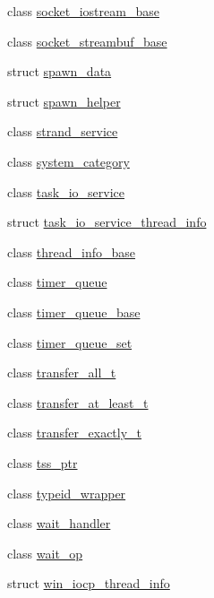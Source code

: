 \begin{DoxyCompactItemize}
class \hyperlink{classasio_1_1detail_1_1socket__iostream__base}{socket\+\_\+iostream\+\_\+base}
\item 
class \hyperlink{classasio_1_1detail_1_1socket__streambuf__base}{socket\+\_\+streambuf\+\_\+base}
\item 
struct \hyperlink{structasio_1_1detail_1_1spawn__data}{spawn\+\_\+data}
\item 
struct \hyperlink{structasio_1_1detail_1_1spawn__helper}{spawn\+\_\+helper}
\item 
class \hyperlink{classasio_1_1detail_1_1strand__service}{strand\+\_\+service}
\item 
class \hyperlink{classasio_1_1detail_1_1system__category}{system\+\_\+category}
\item 
class \hyperlink{classasio_1_1detail_1_1task__io__service}{task\+\_\+io\+\_\+service}
\item 
struct \hyperlink{structasio_1_1detail_1_1task__io__service__thread__info}{task\+\_\+io\+\_\+service\+\_\+thread\+\_\+info}
\item 
class \hyperlink{classasio_1_1detail_1_1thread__info__base}{thread\+\_\+info\+\_\+base}
\item 
class \hyperlink{classasio_1_1detail_1_1timer__queue}{timer\+\_\+queue}
\item 
class \hyperlink{classasio_1_1detail_1_1timer__queue__base}{timer\+\_\+queue\+\_\+base}
\item 
class \hyperlink{classasio_1_1detail_1_1timer__queue__set}{timer\+\_\+queue\+\_\+set}
\item 
class \hyperlink{classasio_1_1detail_1_1transfer__all__t}{transfer\+\_\+all\+\_\+t}
\item 
class \hyperlink{classasio_1_1detail_1_1transfer__at__least__t}{transfer\+\_\+at\+\_\+least\+\_\+t}
\item 
class \hyperlink{classasio_1_1detail_1_1transfer__exactly__t}{transfer\+\_\+exactly\+\_\+t}
\item 
class \hyperlink{classasio_1_1detail_1_1tss__ptr}{tss\+\_\+ptr}
\item 
class \hyperlink{classasio_1_1detail_1_1typeid__wrapper}{typeid\+\_\+wrapper}
\item 
class \hyperlink{classasio_1_1detail_1_1wait__handler}{wait\+\_\+handler}
\item 
class \hyperlink{classasio_1_1detail_1_1wait__op}{wait\+\_\+op}
\item 
struct \hyperlink{structasio_1_1detail_1_1win__iocp__thread__info}{win\+\_\+iocp\+\_\+thread\+\_\+info}
\item 

\end{DoxyCompactItemize}
